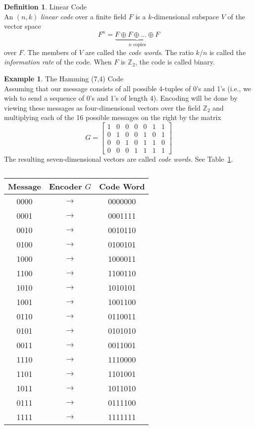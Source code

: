 \documentclass{article}
\newcommand{\Z}{\mathbb{Z}}
\theoremstyle{definition}
\newtheorem{definition}{Definition}
\newtheorem{example}{Example}
\begin{document}
\begin{definition}{Linear Code}\\An $(n,k)$ \textit{linear code} over a finite field $F$ is a $k$-dimensional subspace $V$ of the vector space \[F^n = \underbrace{F\oplus F\oplus \dots \oplus F}_{\text{$n$ copies}}\]
over $F$. The members of $V$ are called the \textit{code words}. The ratio $k/n$ is called the \textit{information rate} of the code. When $F$ is $\Z_2$, the code is called binary.
\end{definition}

\begin{example}{The Hamming (7,4) Code}\\
Assuming that our message consists of all possible 4-tuples of 0's and 1's (i.e., we wish to send a sequence of 0's and 1's of length 4). Encoding will be done by viewing these messages as four-dimensional vectors over the field $\Z_2$ and multiplying each of the 16 possible messages on the right by the matrix
\[G=\begin{bmatrix}
1&0&0&0&0&1&1\\
0&1&0&0&1&0&1\\
0&0&1&0&1&1&0\\
0&0&0&1&1&1&1
\end{bmatrix}\]
The resulting seven-dimensional vectors are called \textit{code words.} See Table~\ref{tab:hamming(7,4)}.
\begin{table}[ht!]
    \centering
    \begin{tabular}{c c c}
        \hline
        Message & Encoder $G$ & Code Word\\
        \hline
        0000 & $\rightarrow$ & 0000000 \\
        0001 & $\rightarrow$ & 0001111 \\
        0010 & $\rightarrow$ & 0010110 \\
        0100 & $\rightarrow$ & 0100101 \\
        1000 & $\rightarrow$ & 1000011 \\
        1100 & $\rightarrow$ & 1100110 \\
        1010 & $\rightarrow$ & 1010101 \\
        1001 & $\rightarrow$ & 1001100 \\
        0110 & $\rightarrow$ & 0110011 \\
        0101 & $\rightarrow$ & 0101010 \\
        0011 & $\rightarrow$ & 0011001 \\
        1110 & $\rightarrow$ & 1110000 \\
        1101 & $\rightarrow$ & 1101001 \\
        1011 & $\rightarrow$ & 1011010 \\
        0111 & $\rightarrow$ & 0111100 \\
        1111 & $\rightarrow$ & 1111111 \\
    \end{tabular}
    \caption{}
    \label{tab:hamming(7,4)}
\end{table}
\end{example}
\end{document}
